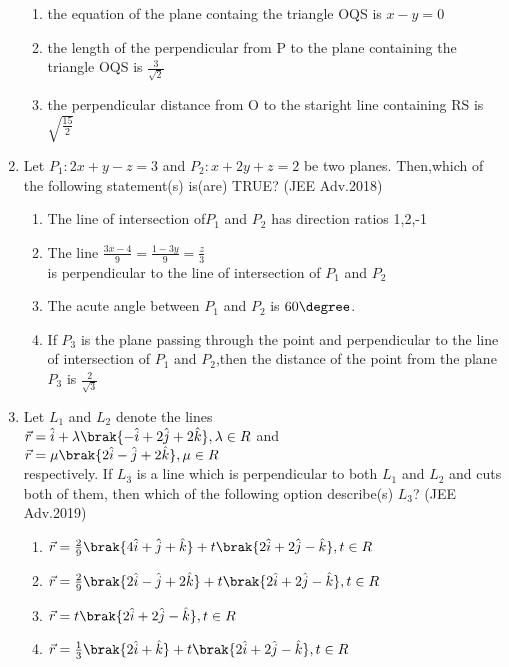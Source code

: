 \begin{enumerate}
\begin{enumerate}
			\item the equation of the plane containg the triangle OQS is $x-y=0$
			\item the length of the perpendicular from P to the plane containing the triangle OQS is $\frac{3}{\sqrt{2}}$
			\item the perpendicular distance from O to the staright line containing RS is $\sqrt{\frac{15}{2}}$
		\end{enumerate}
	\item Let $P_1:2x+y-z=3$ and $P_2:x+2y+z=2$ be two planes. Then,which of the following statement(s) is(are) TRUE? \hfill{(JEE Adv.2018)}
		\begin{enumerate}
			\item The line of intersection of$P_1$ and $P_2$ has direction ratios 1,2,-1
			\item The line $\frac{3x-4}{9}=\frac{1-3y}{9}=\frac{z}{3}$ \\ is perpendicular to the line of intersection of $P_1$ and $P_2$
			\item The acute angle between $P_1$ and $P_2$ is $60\degree$.
			\item If $P_3$ is the plane passing through the point  and perpendicular to the line of intersection of $P_1$ and $P_2$,then the distance of the point 
				from the plane $P_3$ is $\frac{2}{\sqrt{3}}$
		\end{enumerate}
	\item Let $L_1$ and $L_2$ denote the lines\\ $\vec{r}=\hat{i}+\lambda\brak{-\hat{i}+2\hat{j}+2\hat{k}}, \lambda \in R$ and \\
		$\vec{r}=\mu \brak{2\hat{i}-\hat{j}+2\hat{k}}, \mu \in R$\\ respectively. If $L_3$ is a line which is perpendicular to both $L_1$ and $L_2$ and cuts both of them, then which of 
		the following option describe(s) $L_3$? \hfill{(JEE Adv.2019)}
		\begin{enumerate}
			\item $\vec{r}=\frac{2}{9}\brak{4\hat{i}+\hat{j}+\hat{k}}+t\brak{2\hat{i}+2\hat{j}-\hat{k}},t \in R$
			\item $\vec{r}=\frac{2}{9}\brak{2\hat{i}-\hat{j}+2\hat{k}}+t\brak{2\hat{i}+2\hat{j}-\hat{k}}, t \in R$
			\item $\vec{r}=t\brak{2\hat{i}+2\hat{j}-\hat{k}},t \in R$
			\item $\vec{r}=\frac{1}{3}\brak{2\hat{i}+\hat{k}}+t\brak{2\hat{i}+2\hat{j}-\hat{k}},t \in R$
		\end{enumerate}

\end{enumerate}
